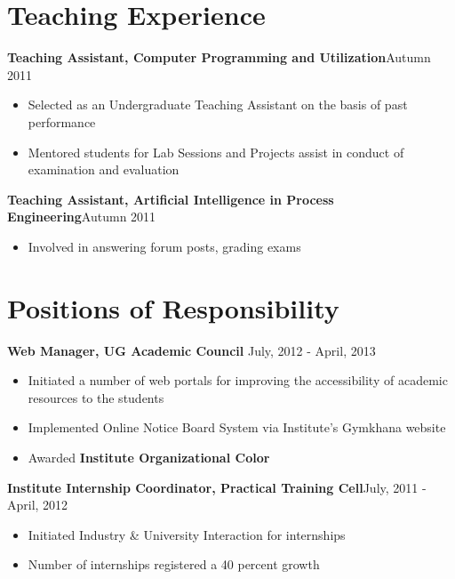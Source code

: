 \documentclass[margin,line]{res}
\begin{document}
\begin{resume}
\section{Teaching Experience}
\textbf{Teaching Assistant, Computer Programming and Utilization}\hfill{Autumn 2011}
\begin{itemize}
\item {Selected as an Undergraduate Teaching Assistant on the basis of past performance}
\item {Mentored students for Lab Sessions and Projects assist in conduct of examination and evaluation}
\end{itemize}

\vspace{.3cm}
\textbf{Teaching Assistant, Artificial Intelligence in Process Engineering}\hfill{Autumn 2011}
\begin{itemize}
\item {Involved in answering forum posts, grading exams}
\end{itemize}

\section{\sc Positions of Responsibility}
\textbf{Web Manager, UG Academic Council} \hfill {July, 2012 - April, 2013}
\begin{itemize}
\item {Initiated a number of web portals for improving the accessibility of academic resources to the students} 
\item {Implemented  Online Notice Board System via Institute's Gymkhana website} 
\item {Awarded \textbf{Institute Organizational Color}}
\end{itemize}

\vspace{.3cm}
\textbf{Institute Internship Coordinator, Practical Training Cell}\hfill{July, 2011 - April, 2012}
\begin{itemize}
\item {Initiated Industry \& University Interaction for internships} 
\item {Number of internships registered a 40 percent growth}
\end{itemize}


\end{resume}
\end{document}
